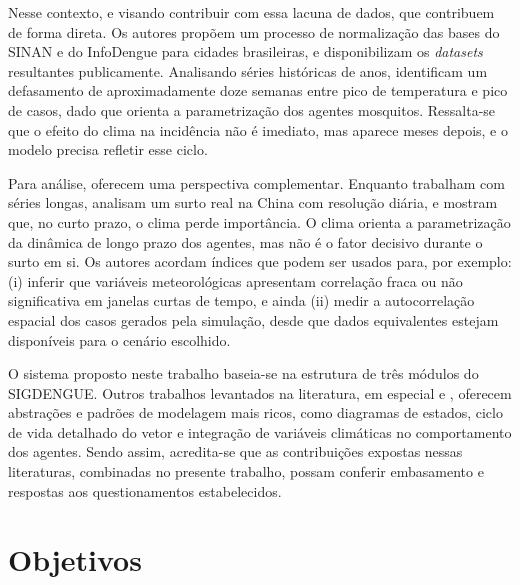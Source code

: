 Nesse contexto, e visando contribuir com essa lacuna de dados, que  contribuem de forma direta.
Os autores propõem um processo de normalização das bases do SINAN e do
InfoDengue para cidades brasileiras, e disponibilizam os \textit{datasets} resultantes publicamente.
Analisando séries históricas de anos, identificam um defasamento de aproximadamente doze
semanas entre pico de temperatura e pico de casos, dado que orienta a parametrização
dos agentes mosquitos. Ressalta-se que o efeito do clima na incidência não é imediato, mas aparece meses
depois, e o modelo precisa refletir esse ciclo.

Para análise,  oferecem uma perspectiva complementar. Enquanto
 trabalham com séries longas,  analisam
um surto real na China com resolução diária, e mostram que, no curto prazo, o clima
perde importância. O clima orienta a parametrização da dinâmica de
longo prazo dos agentes, mas não é o fator decisivo durante o surto em si.
Os autores acordam índices que podem ser usados para, por exemplo: (i) inferir que variáveis
meteorológicas apresentam correlação fraca ou não significativa em janelas curtas de tempo,
e ainda (ii) medir a autocorrelação espacial dos casos gerados pela simulação,
desde que dados equivalentes estejam disponíveis para o cenário escolhido.


O sistema proposto neste trabalho baseia-se na estrutura de três módulos do SIGDENGUE. %
Outros trabalhos levantados na literatura, em especial 
e , oferecem abstrações e padrões de modelagem mais ricos,
como diagramas de estados, ciclo de vida detalhado do vetor e integração de variáveis
climáticas no comportamento dos agentes. Sendo assim, acredita-se que as contribuições
expostas nessas literaturas, combinadas no presente trabalho, possam conferir embasamento
e respostas aos questionamentos estabelecidos.


\section{Objetivos}
\label{1-objetivos}

